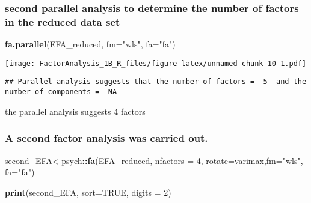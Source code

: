 \documentclass[
]{article}
\newenvironment{Shaded}{\begin{snugshade}}{\end{snugshade}}
\newcommand{\DataTypeTok}[1]{\textcolor[rgb]{0.13,0.29,0.53}{#1}}
\newcommand{\DecValTok}[1]{\textcolor[rgb]{0.00,0.00,0.81}{#1}}
\newcommand{\KeywordTok}[1]{\textcolor[rgb]{0.13,0.29,0.53}{\textbf{#1}}}
\newcommand{\NormalTok}[1]{#1}
\newcommand{\OperatorTok}[1]{\textcolor[rgb]{0.81,0.36,0.00}{\textbf{#1}}}
\newcommand{\OtherTok}[1]{\textcolor[rgb]{0.56,0.35,0.01}{#1}}
\newcommand{\StringTok}[1]{\textcolor[rgb]{0.31,0.60,0.02}{#1}}
\begin{document}
\hypertarget{second-parallel-analysis-to-determine-the-number-of-factors-in-the-reduced-data-set}{%
\subsubsection{second parallel analysis to determine the number of
factors in the reduced data
set}\label{second-parallel-analysis-to-determine-the-number-of-factors-in-the-reduced-data-set}}

\begin{Shaded}
\begin{Highlighting}[]
\KeywordTok{fa.parallel}\NormalTok{(EFA\_reduced,  }\DataTypeTok{fm=}\StringTok{"wls"}\NormalTok{, }\DataTypeTok{fa=}\StringTok{"fa"}\NormalTok{)}
\end{Highlighting}
\end{Shaded}

\texttt{[image: FactorAnalysis\_1B\_R\_files/figure-latex/unnamed-chunk-10-1.pdf]}

\begin{verbatim}
## Parallel analysis suggests that the number of factors =  5  and the number of components =  NA
\end{verbatim}

the parallel analysis suggests 4 factors

\hypertarget{a-second-factor-analysis-was-carried-out.}{%
\subsubsection{A second factor analysis was carried
out.}\label{a-second-factor-analysis-was-carried-out.}}

\begin{Shaded}
\begin{Highlighting}[]
\NormalTok{second\_EFA\textless{}{-}psych}\OperatorTok{::}\KeywordTok{fa}\NormalTok{(EFA\_reduced, }\DataTypeTok{nfactors =} \DecValTok{4}\NormalTok{, }\DataTypeTok{rotate=}\StringTok{\textquotesingle{}varimax\textquotesingle{}}\NormalTok{,}\DataTypeTok{fm=}\StringTok{"wls"}\NormalTok{, }\DataTypeTok{fa=}\StringTok{"fa"}\NormalTok{)}

\KeywordTok{print}\NormalTok{(second\_EFA, }\DataTypeTok{sort=}\OtherTok{TRUE}\NormalTok{, }\DataTypeTok{digits =} \DecValTok{2}\NormalTok{)}
\end{Highlighting}
\end{Shaded}
\end{document}

